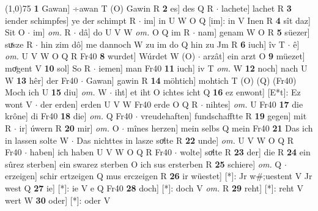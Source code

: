 \documentclass[8pt,a4paper,notitlepage]{article}
\begin{document}
\begin{table}[ht]
\begin{minipage}[t]{0.5\linewidth}
\line(1,0){75} \newline
\textbf{1} Gawan] ÷awan T (O) Gawin R \textbf{2} es] des Q R  $\cdot$ lachete] lachet R \textbf{3} iender schimpfes] ye der schimpt R  $\cdot$ im] in U W O Q [im]: in V Inen R \textbf{4} sît daz] Sit O  $\cdot$ im] \textit{om.} R  $\cdot$ dâ] do U V W \textit{om.} O Q im R  $\cdot$ nam] genam W O R \textbf{5} süezer] suͯsze R  $\cdot$ hin zim dô] me dannoch W zu im do Q hin zu Jm R \textbf{6} iuch] îv T  $\cdot$ ê] \textit{om.} U V W O Q R Fr40 \textbf{8} wurdet] Wúrdet W (O)  $\cdot$ arzât] ein arzt O \textbf{9} müezet] moͤgent V \textbf{10} sol] So R  $\cdot$ iemen] man Fr40 \textbf{11} iuch] iv T \textit{om.} W \textbf{12} noch] nach U W \textbf{13} hêr] der Fr40  $\cdot$ Gawan] gawin R \textbf{14} möhtich] mohtich T (O) (Q) (Fr40) Moch ich U \textbf{15} diu] \textit{om.} W  $\cdot$ iht] et iht O ichtes icht Q \textbf{16} ez enwont] [E*t]: Ez wont V  $\cdot$ der erden] erden U V W Fr40 erde O Q R  $\cdot$ nihtes] \textit{om.} U Fr40 \textbf{17} die krône] di Fr40 \textbf{18} die] \textit{om.} Q Fr40  $\cdot$ vreudehaften] fundschafftte R \textbf{19} gegen] mit R  $\cdot$ ir] úwern R \textbf{20} mir] \textit{om.} O  $\cdot$ mînes herzen] mein selbs Q mein Fr40 \textbf{21} Das ich in lassen solte W  $\cdot$ Das nichttes in lasze soͯlte R \textbf{22} unde] \textit{om.} U V W O Q R Fr40  $\cdot$ haben] ich haben U V W O Q R Fr40  $\cdot$ wolte] soͯlte R \textbf{23} der] die R \textbf{24} ein sûrez sterben] ein swarez sterben O ich sus ersterben R \textbf{25} schiere] \textit{om.} Q  $\cdot$ erzeigen] schir ertzeigen Q mus erczeigen R \textbf{26} ir wüestet] [*]: Jr w#;uestent V Jr west Q \textbf{27} ie] [*]: ie V e Q Fr40 \textbf{28} doch] [*]: doch V \textit{om.} R \textbf{29} reht] [*]: reht V wert W \textbf{30} oder] [*]: oder V \newline
\end{minipage}
\end{table}
\end{document}
